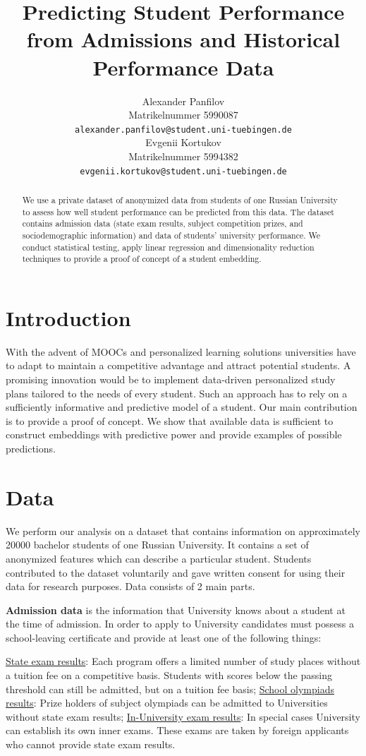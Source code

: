 \documentclass{article}
\title{Predicting Student Performance\\ from Admissions and Historical Performance Data}
\author{%
  Alexander Panfilov\\
  Matrikelnummer 5990087\\
  \texttt{alexander.panfilov@student.uni-tuebingen.de} \\
  \And
  Evgenii Kortukov\\
  Matrikelnummer 5994382\\
  \texttt{evgenii.kortukov@student.uni-tuebingen.de} \\
}
\begin{document}
\maketitle

\begin{abstract}
   We use a private dataset of anonymized data from students of
one Russian University to assess how well student performance can be
predicted from this data. The dataset contains admission data (state exam results, subject competition prizes, and sociodemographic
information) and data of students’ university performance. We conduct statistical testing, apply linear
regression and dimensionality reduction techniques to provide a proof of concept of a student embedding.
\end{abstract}

\section{Introduction}
\label{sec:intro}
With the advent of MOOCs and personalized learning solutions universities have to adapt to maintain a competitive advantage and attract potential students. A promising innovation would be to implement data-driven personalized study plans tailored to the needs of every student. Such an approach has to rely on a sufficiently informative and predictive model of a student. Our main contribution is to provide a proof of concept. We show that available data is sufficient to construct embeddings with predictive power and provide examples of possible predictions.

\section{Data}
\label{sec:data}
We perform our analysis on a dataset that contains information on approximately 20000 bachelor students of one Russian University. It contains a set of anonymized features which can describe a particular student. Students contributed to the dataset voluntarily and gave written consent for using their data for research purposes. Data consists of 2 main parts.

\textbf{Admission data} is the information that University knows about a student at the time of admission. In order to apply to University candidates must possess a school-leaving certificate and provide at least one of the following things: 

  \underline{State exam results}: Each program offers a limited number of study places without a tuition fee on a competitive basis. Students with scores below the passing threshold can still be admitted, but on a tuition fee basis;
  \underline{School olympiads results}: Prize holders of subject olympiads can be admitted to Universities without state exam results;
  \underline{In-University exam results}: In special cases University can establish its own inner exams. These exams are taken by foreign applicants who cannot provide state exam results.
\end{document}
